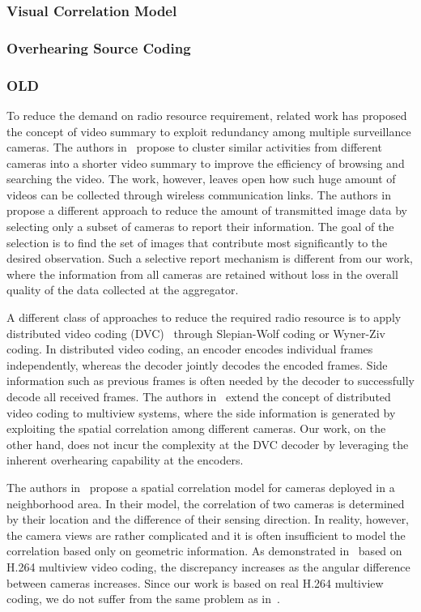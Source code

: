 \subsubsection{Visual Correlation Model}
%
\subsubsection{Overhearing Source Coding}

\subsubsection{OLD}
To reduce the demand on radio resource requirement, related work has proposed the concept of video summary to exploit redundancy among multiple surveillance cameras.
The authors in~\cite{ClusteredSynopsis} propose to cluster similar activities from different cameras into a shorter video summary to improve the efficiency of browsing and searching the video.
The work, however, leaves open how such huge amount of videos can be collected through wireless communication links.
The authors in~\cite{CameraSelection} propose a different approach to reduce the amount of transmitted image data by selecting only a subset of cameras to report their information.
The goal of the selection is to find the set of images that contribute most significantly to the desired observation.
Such a selective report mechanism is different from our work, where the information from all cameras are retained without loss in the overall quality of the data collected at the aggregator.

A different class of approaches to reduce the required radio resource is to apply distributed video coding (DVC)~\cite{DVC} through Slepian-Wolf coding or Wyner-Ziv coding.
In distributed video coding, an encoder encodes individual frames independently, whereas the decoder jointly decodes the encoded frames.
Side information such as previous frames is often needed by the decoder to successfully decode all received frames.
The authors in~\cite{DVCinMVC} extend the concept of distributed video coding to multiview systems, where the side information is generated by exploiting the spatial correlation among different cameras.
Our work, on the other hand, does not incur the complexity at the DVC decoder by leveraging the inherent overhearing capability at the encoders.

The authors in~\cite{SpatialCorrelationModel} propose a spatial correlation model for cameras deployed in a neighborhood area.
In their model, the correlation of two cameras is determined by their location and the difference of their sensing direction.
In reality, however, the camera views are rather complicated and it is often insufficient to model the correlation based only on geometric information.
As demonstrated in~\cite{RealisticModel} based on H.264 multiview video coding, the discrepancy increases as the angular difference between cameras increases.
Since our work is based on real H.264 multiview coding, we do not suffer from the same problem as in~\cite{SpatialCorrelationModel}.
%

